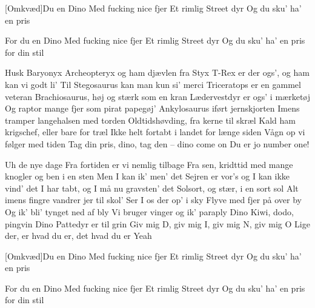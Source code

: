 \documentclass[a4paper,12pt]{article}
\begin{document}
\begin{song}
[Omkvæd]Du en Dino
Med fucking nice fjer
Et rimlig Street dyr
Og du sku' ha' en pris

For du en Dino
Med fucking nice fjer
Et rimlig Street dyr
Og du sku' ha' en pris for din stil

Husk
Baryonyx
Archeopteryx og ham djævlen fra Styx
T-Rex er der ogs', og ham kan vi godt li'
Til Stegosaurus kan man kun si' merci
Triceratops er en gammel veteran
Brachiosaurus, høj og stærk som en kran
Lædervestdyr er ogs' i mærketøj
Og raptor mange fjer som pirat papegøj'
Ankylosaurus iført jernskjorten
Imens tramper langehalsen med torden
Oldtidshøvding, fra kerne til skræl
Kald ham krigschef, eller bare for træl
Ikke helt fortabt i landet for længe siden
Vågn op vi følger med tiden
Tag din pris, dino, tag den -- dino come on
Du er jo number one!

Uh de nye dage
Fra fortiden er vi nemlig tilbage
Fra sen, kridttid med mange knogler og ben i en sten
Men I kan ik' men' det
Sejren er vor's og I kan ikke vind' det
I har tabt, og I må nu gravsten' det
Solsort, og stær, i en sort sol
Alt imens fingre vandrer jer til skol'
Ser I os der op' i sky
Flyve med fjer på over by
Og ik' bli' tynget ned af bly
Vi bruger vinger og ik' paraply
Dino
Kiwi, dodo, pingvin
Dino
Pattedyr er til grin
Giv mig D, giv mig I, giv mig N, giv mig O
Lige der, er hvad du er, det hvad du er
Yeah

[Omkvæd]Du en Dino
Med fucking nice fjer
Et rimlig Street dyr
Og du sku' ha' en pris

For du en Dino
Med fucking nice fjer
Et rimlig Street dyr
Og du sku' ha' en pris for din stil



\end{song}
\end{document}
